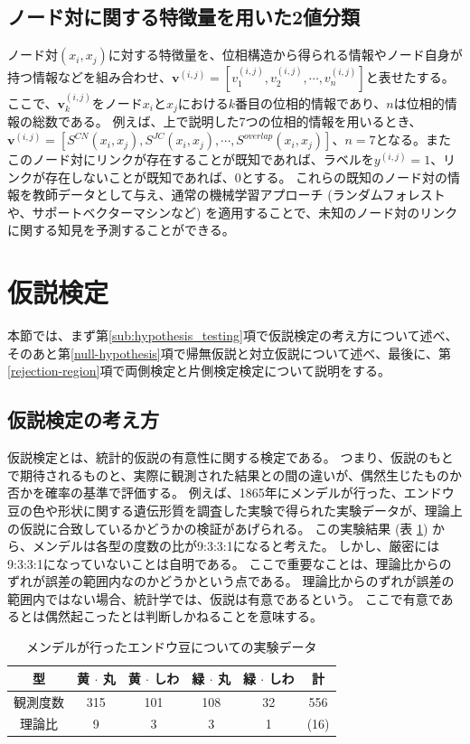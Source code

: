 \documentclass[titlepage,12pt]{jreport}
\begin{document}
\subsection{ノード対に関する特徴量を用いた2値分類}
ノード対$(x_i, x_j)$に対する特徴量を、位相構造から得られる情報やノード自身が持つ情報などを組み合わせ、$\bm{v}^{(i, j)} = [v^{(i, j)}_1, v^{(i, j)}_2, \cdots, v^{(i, j)}_n]$と表せたする。 ここで、$\bm{v}^{(i, j)}_k$をノード$x_i$と$x_j$における$k$番目の位相的情報であり、$n$は位相的情報の総数である。 例えば、上で説明した7つの位相的情報を用いるとき、$\bm{v}^{(i, j)} = [S^{CN}(x_i, x_j), S^{JC}(x_i, x_j), \cdots, S^{overlap}(x_i, x_j)]$、$n = 7$となる。またこのノード対にリンクが存在することが既知であれば、ラベルを$y^{(i,j)} = 1$、リンクが存在しないことが既知であれば、$0$とする。 これらの既知のノード対の情報を教師データとして与え、通常の機械学習アプローチ (ランダムフォレストや、サポートベクターマシンなど) を適用することで、未知のノード対のリンクに関する知見を予測することができる。

\section{仮説検定\label{hypothesis_testing}}
本節では、まず第\ref{sub:hypothesis_testing}項で仮説検定の考え方について述べ、そのあと第\ref{null-hypothesis}項で帰無仮説と対立仮説について述べ、最後に、第\ref{rejection-region}項で両側検定と片側検定検定について説明をする。
\subsection{仮説検定の考え方\label{sub:hypothesis_testing}}
仮説検定とは、統計的仮説の有意性に関する検定である。 つまり、仮説のもとで期待されるものと、実際に観測された結果との間の違いが、偶然生じたものか否かを確率の基準で評価する。 例えば、1865年にメンデルが行った、エンドウ豆の色や形状に関する遺伝形質を調査した実験で得られた実験データが、理論上の仮説に合致しているかどうかの検証があげられる。 この実験結果 (表 \ref{tab:mendel}) から、メンデルは各型の度数の比が9:3:3:1になると考えた。 しかし、厳密には9:3:3:1になっていないことは自明である。 ここで重要なことは、理論比からのずれが誤差の範囲内なのかどうかという点である。 理論比からのずれが誤差の範囲内ではない場合、統計学では、仮説は有意であるという。 ここで有意であるとは偶然起こったとは判断しかねることを意味する。
\begin{table}[tbp]
	\begin{center}
		\caption{メンデルが行ったエンドウ豆についての実験データ}
		\begin{tabular}{c|ccccc} \hline
			型 & 黄 $\cdot$ 丸 & 黄 $\cdot$ しわ & 緑 $\cdot$ 丸 & 緑 $\cdot$ しわ & 計 \\ \hline
			観測度数 & 315 & 101 & 108 & 32 & 556 \\ \hline
			理論比 & 9 & 3 & 3 & 1 & (16)\\ \hline 
		\end{tabular}
		\label{tab:mendel}
	\end{center}
\end{table}
\end{document}
